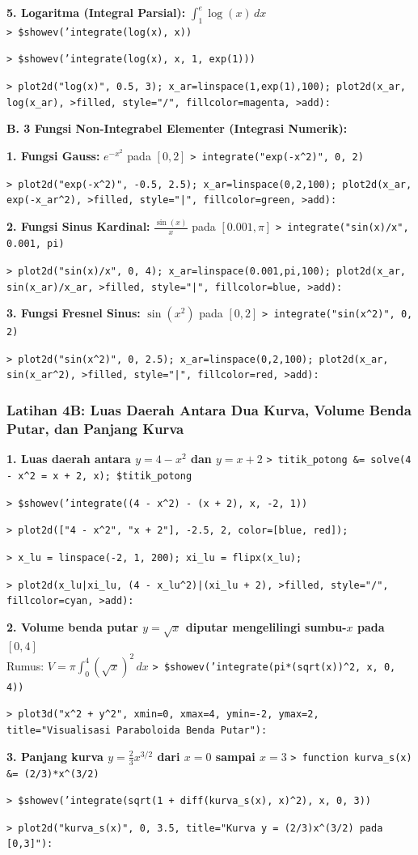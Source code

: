 \documentclass[11pt, a4paper]{article}
\newcommand{\emtcmd}[1]{\noindent\texttt{\textcolor{emtcommand}{>}\ #1}\par\smallskip}
\begin{document}
\textbf{5. Logaritma (Integral Parsial):} $\int_1^e \log(x) \, dx$
\emtcmd{\$showev('integrate(log(x), x))}
\emtcmd{\$showev('integrate(log(x), x, 1, exp(1)))}
\emtcmd{plot2d("log(x)", 0.5, 3); x\_ar=linspace(1,exp(1),100); plot2d(x\_ar, log(x\_ar), >filled, style="/", fillcolor=magenta, >add):}

\medskip
\textbf{B. 3 Fungsi Non-Integrabel Elementer (Integrasi Numerik):}

\textbf{1. Fungsi Gauss:} $e^{-x^2}$ pada $[0, 2]$
\emtcmd{integrate("exp(-x\^{}2)", 0, 2)}
\emtcmd{plot2d("exp(-x\^{}2)", -0.5, 2.5); x\_ar=linspace(0,2,100); plot2d(x\_ar, exp(-x\_ar\^{}2), >filled, style="|", fillcolor=green, >add):}

\textbf{2. Fungsi Sinus Kardinal:} $\frac{\sin(x)}{x}$ pada $[0.001, \pi]$
\emtcmd{integrate("sin(x)/x", 0.001, pi)}
\emtcmd{plot2d("sin(x)/x", 0, 4); x\_ar=linspace(0.001,pi,100); plot2d(x\_ar, sin(x\_ar)/x\_ar, >filled, style="|", fillcolor=blue, >add):}

\textbf{3. Fungsi Fresnel Sinus:} $\sin(x^2)$ pada $[0, 2]$
\emtcmd{integrate("sin(x\^{}2)", 0, 2)}
\emtcmd{plot2d("sin(x\^{}2)", 0, 2.5); x\_ar=linspace(0,2,100); plot2d(x\_ar, sin(x\_ar\^{}2), >filled, style="|", fillcolor=red, >add):}

\subsubsection*{Latihan 4B: Luas Daerah Antara Dua Kurva, Volume Benda Putar, dan Panjang Kurva}

\textbf{1. Luas daerah antara $y = 4 - x^2$ dan $y = x + 2$}
\emtcmd{titik\_potong \&= solve(4 - x\^{}2 = x + 2, x); \$titik\_potong}
\emtcmd{\$showev('integrate((4 - x\^{}2) - (x + 2), x, -2, 1))}
\emtcmd{plot2d(["4 - x\^{}2", "x + 2"], -2.5, 2, color=[blue, red]);}
\emtcmd{x\_lu = linspace(-2, 1, 200); xi\_lu = flipx(x\_lu);}
\emtcmd{plot2d(x\_lu|xi\_lu, (4 - x\_lu\^{}2)|(xi\_lu + 2), >filled, style="/", fillcolor=cyan, >add):}

\textbf{2. Volume benda putar $y = \sqrt{x}$ diputar mengelilingi sumbu-$x$ pada $[0, 4]$} \\
Rumus: $V = \pi \int_0^4 (\sqrt{x})^2 \, dx$
\emtcmd{\$showev('integrate(pi*(sqrt(x))\^{}2, x, 0, 4))}
\emtcmd{plot3d("x\^{}2 + y\^{}2", xmin=0, xmax=4, ymin=-2, ymax=2, title="Visualisasi Paraboloida Benda Putar"):}

\textbf{3. Panjang kurva $y = \frac{2}{3}x^{3/2}$ dari $x = 0$ sampai $x = 3$}
\emtcmd{function kurva\_s(x) \&= (2/3)*x\^{}(3/2)}
\emtcmd{\$showev('integrate(sqrt(1 + diff(kurva\_s(x), x)\^{}2), x, 0, 3))}
\emtcmd{plot2d("kurva\_s(x)", 0, 3.5, title="Kurva y = (2/3)x\^{}(3/2) pada [0,3]"):}
\end{document}
